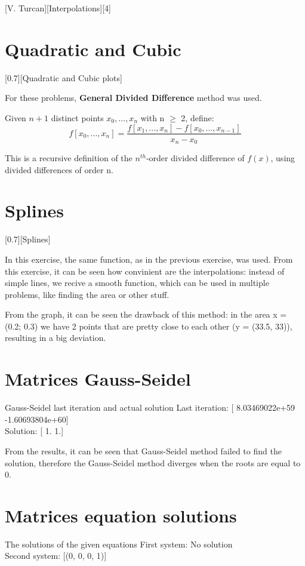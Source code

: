 \documentclass{article}
\begin{document}
	[V. Turcan][Interpolations][4]

	\section{Quadratic and Cubic}
		[0.7][Quadratic and Cubic plots]

		\par For these problems, \textbf{General Divided Difference} method was used.
		\par Given \(n + 1\) distinct points $x_0, ..., x_n$ with n $\geqslant$ 2, define:
		\[
			f[x_0, ..., x_n] =
				\frac{f[x_1, ..., x_n] - f[x_0, ..., x_{n-1}]}{x_n - x_0}
		\]
		\par This is a recursive definition of the $n^{th}$-order divided difference of $f(x)$, using divided differences of order n.

	\newpage
	\section{Splines}
		[0.7][Splines]

		\par In this exercise, the same function, as in the previous exercise, was used. From this exercise, it can be seen how convinient are the interpolations: instead of simple lines, we recive a smooth function, which can be used in multiple problems, like finding the area or other stuff.
		\par From the graph, it can be seen the drawback of this method: in the area x = (0.2; 0.3) we have 2 points that are pretty close to each other (y = (33.5, 33)), resulting in a big deviation.

	\section{Matrices Gauss-Seidel}
		\begin{myResult}{Gauss-Seidel last iteration and actual solution}
			Last iteration:  [  8.03469022e+59  -1.60693804e+60]\\
			Solution:	 [ 1.  1.]\\
		\end{myResult}

		\par From the results, it can be seen that Gauss-Seidel method failed to find the solution, therefore the Gauss-Seidel method diverges when the roots are equal to 0.

	\section{Matrices equation solutions}
		\begin{myResult}{The solutions of the given equations}
			First system: No solution\\
			Second system: [(0, 0, 0, 1)]\\
		\end{myResult}
\end{document}

